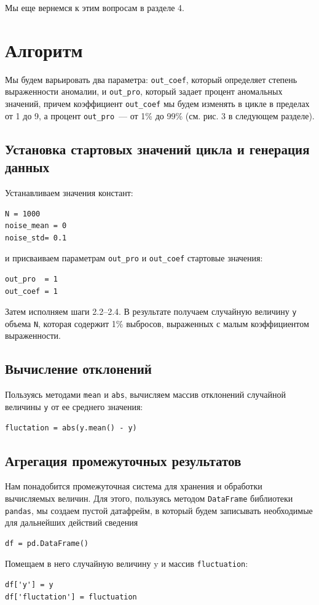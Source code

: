 \documentclass[a4paper,12pt]{article}
\begin{document}
Мы еще вернемся к этим вопросам в разделе 4.

\section{Алгоритм} 

Мы будем варьировать два параметра: \texttt{out\_coef}, который определяет степень выраженности аномалии, и \texttt{out\_pro}, который задает процент аномальных значений, причем коэффициент \texttt{out\_coef} мы будем изменять в цикле в пределах от 1 до 9, а процент \texttt{out\_pro} — от 1\% до 99\% (см. рис. 3 в следующем разделе).


\subsection{Установка стартовых значений цикла и генерация данных}

Устанавливаем значения констант:
\begin{verbatim}
N = 1000
noise_mean = 0 
noise_std= 0.1
\end{verbatim}
и присваиваем параметрам \texttt{out\_pro} и \texttt{out\_coef} стартовые значения:
\begin{verbatim}
out_pro  = 1
out_coef = 1
\end{verbatim}
Затем исполняем шаги 2.2–2.4.  В результате получаем случайную величину  \texttt{y} объема \texttt{N}, которая содержит 1\% выбросов, выраженных с малым коэффициентом выраженности.


\subsection{Вычисление отклонений}


Пользуясь методами  \texttt{mean} и \texttt{abs}, вычисляем массив отклонений случайной величины \texttt{y} от ее среднего значения:
\begin{verbatim}
fluctation = abs(y.mean() - y)
\end{verbatim}

\subsection{Агрегация промежуточных результатов}

Нам понадобится промежуточная система для хранения и обработки вычисляемых величин. Для этого, пользуясь методом \texttt{DataFrame} библиотеки \texttt{pandas}, мы создаем пустой датафрейм, в который будем записывать необходимые для дальнейших действий сведения
\begin{verbatim}
df = pd.DataFrame() 
\end{verbatim}
Помещаем в него случайную величину y и массив \texttt{fluctuation}:
\begin{verbatim}
df['y'] = y
df['fluctation'] = fluctuation
\end{verbatim}
\end{document}

